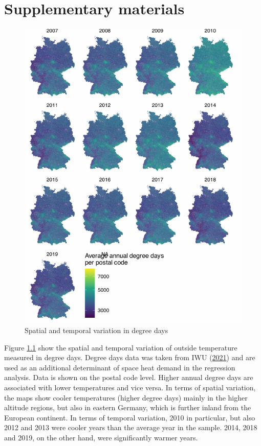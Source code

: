 \documentclass[12pt,twoside]{reedthesis}
\begin{document}
\appendix

\hypertarget{supplementary-materials}{%
\chapter{Supplementary materials}\label{supplementary-materials}}

\singlespacing
\newpage
\begin{figure}

{\centering \includegraphics[width=0.77\linewidth]{figure/distribution_degree_days} 

}

\caption{Spatial and temporal variation in degree days}\label{fig:degree-days-distribution}
\end{figure}
\noindent
Figure \ref{fig:degree-days-distribution} show the spatial and temporal variation of outside temperature measured in degree days. Degree days data was taken from IWU (\protect\hyperlink{ref-iwu21}{2021}) and are used as an additional determinant of space heat demand in the regression analysis. Data is shown on the postal code level. Higher annual degree days are associated with lower temperatures and vice versa. In terms of spatial variation, the maps show cooler temperatures (higher degree days) mainly in the higher altitude regions, but also in eastern Germany, which is further inland from the European continent. In terms of temporal variation, 2010 in particular, but also 2012 and 2013 were cooler years than the average year in the sample. 2014, 2018 and 2019, on the other hand, were significantly warmer years.
\end{document}
